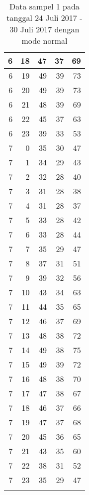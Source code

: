 \begin{longtable}{|r|r|r|r|r|}
    \hline
    6     & 18    & 47    & 37    & 69 \\
    \hline
    6     & 19    & 49    & 39    & 73 \\
    \hline
    6     & 20    & 49    & 39    & 73 \\
    \hline
    6     & 21    & 48    & 39    & 69 \\
    \hline
    6     & 22    & 45    & 37    & 63 \\
    \hline
    6     & 23    & 39    & 33    & 53 \\
    \hline
    7     & 0     & 35    & 30    & 47 \\
    \hline
    7     & 1     & 34    & 29    & 43 \\
    \hline
    7     & 2     & 32    & 28    & 40 \\
    \hline
    7     & 3     & 31    & 28    & 38 \\
    \hline
    7     & 4     & 31    & 28    & 37 \\
    \hline
    7     & 5     & 33    & 28    & 42 \\
    \hline
    7     & 6     & 33    & 28    & 44 \\
    \hline
    7     & 7     & 35    & 29    & 47 \\
    \hline
    7     & 8     & 37    & 31    & 51 \\
    \hline
    7     & 9     & 39    & 32    & 56 \\
    \hline
    7     & 10    & 43    & 34    & 63 \\
    \hline
    7     & 11    & 44    & 35    & 65 \\
    \hline
    7     & 12    & 46    & 37    & 69 \\
    \hline
    7     & 13    & 48    & 38    & 72 \\
    \hline
    7     & 14    & 49    & 38    & 75 \\
    \hline
    7     & 15    & 49    & 39    & 72 \\
    \hline
    7     & 16    & 48    & 38    & 70 \\
    \hline
    7     & 17    & 47    & 38    & 67 \\
    \hline
    7     & 18    & 46    & 37    & 66 \\
    \hline
    7     & 19    & 47    & 37    & 68 \\
    \hline
    7     & 20    & 45    & 36    & 65 \\
    \hline
    7     & 21    & 43    & 35    & 60 \\
    \hline
    7     & 22    & 38    & 31    & 52 \\
    \hline
    7     & 23    & 35    & 29    & 47 \\
    \hline
	\caption{Data sampel 1 pada tanggal 24 Juli 2017 - 30 Juli 2017 dengan mode normal}
  \label{tab:datasample124072017normal}%
\end{longtable}%


